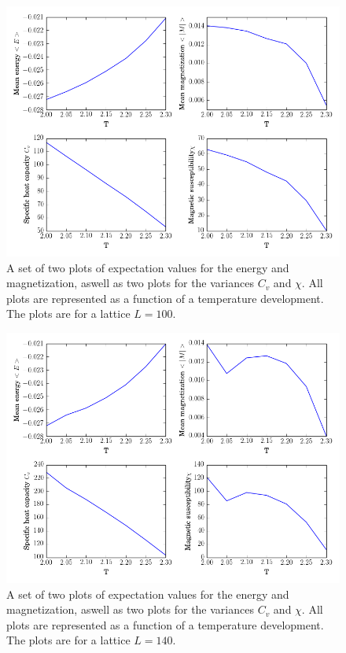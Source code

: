 \documentclass[12pt]{article}
\begin{document}
\begin{figure}[H]
\includegraphics[scale=0.5]{exp_val100.png}
\caption{A set of two plots of expectation values for the energy and magnetization, aswell as two plots for the variances $C_v$ and $\chi$. All plots are represented as a function of a temperature development. The plots are for a lattice $L = 100$.}\label{fig:exp_100}
\end{figure}


\begin{figure}[H]
\includegraphics[scale=0.5]{exp_val140.png}
\caption{A set of two plots of expectation values for the energy and magnetization, aswell as two plots for the variances $C_v$ and $\chi$. All plots are represented as a function of a temperature development. The plots are for a lattice $L = 140$.}\label{fig:exp_140}
\end{figure}
\end{document}

